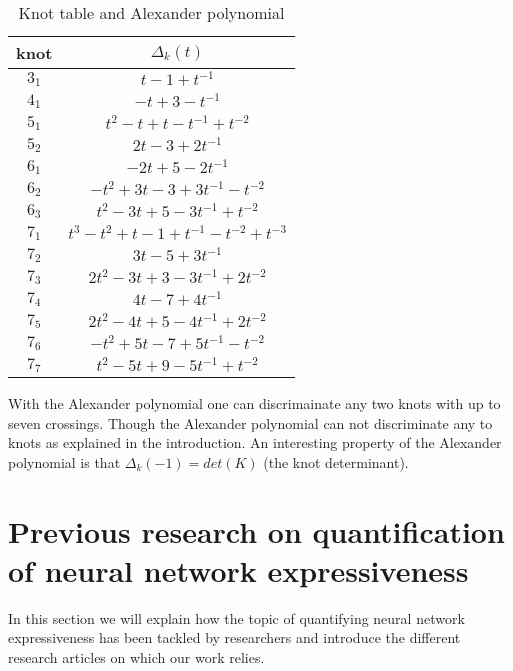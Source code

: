 \documentclass[12pt, a4paper]{article}
\begin{document}
\begin{table}[H]
\begin{center}
  \begin{tabular}{| c | c |}
    \hline
    knot & $\Delta_k(t)$\\
    \hline
    $3_1$ & $t - 1 + t^{-1}$\\
    \hline
    $4_1$ & $-t + 3 -t^{-1}$\\
    \hline
    $5_1$ & $t^2 - t + t - t^{-1} + t^{-2}$\\
    \hline
    $5_2$ & $2t - 3 + 2t^{-1}$\\
    \hline
    $6_1$ & $-2t + 5 -2t^{-1}$\\
    \hline
    $6_2$ & $-t^2 + 3t -3 + 3t^{-1} - t^{-2}$\\
    \hline
    $6_3$ & $t^2 - 3t +5 -3t^{-1} + t^{-2}$\\
    \hline
    $7_1$ & $t^3 - t^2 +t -1 + t^{-1} - t^{-2} + t^{-3}$\\
    \hline
    $7_2$ & $3t -5 + 3t^{-1}$\\
    \hline
    $7_3$ & $2t^2 - 3t + 3 - 3t^{-1} + 2t^{-2}$\\
    \hline
    $7_4$ & $4t -7 + 4t^{-1}$\\
    \hline
    $7_5$ & $2t^2 - 4t + 5 - 4t^{-1} + 2t^{-2}$\\
    \hline
    $7_6$ & $-t^2 +5t -7 +5t^{-1} - t^{-2}$\\
    \hline
    $7_7$ & $t^2 -5t +9 -5t^{-1} + t^{-2}$\\
    \hline
  \end{tabular}
\end{center}
  \caption{Knot table and Alexander polynomial}
\label{tab:knot_alexander}
\end{table}

With the Alexander polynomial one can discrimainate any two knots with up to seven crossings. Though the Alexander polynomial can not discriminate any to knots as explained in the introduction. An interesting property of the Alexander polynomial is that $\Delta_k(-1) = det(K)$ (the knot determinant).

\newpage
\thispagestyle{empty}
\mbox{}
\newpage

\section{Previous research on quantification of neural network expressiveness}

In this section we will explain how the topic of quantifying neural network expressiveness has been tackled by researchers and introduce the different research articles on which our work relies.\\
\end{document}
